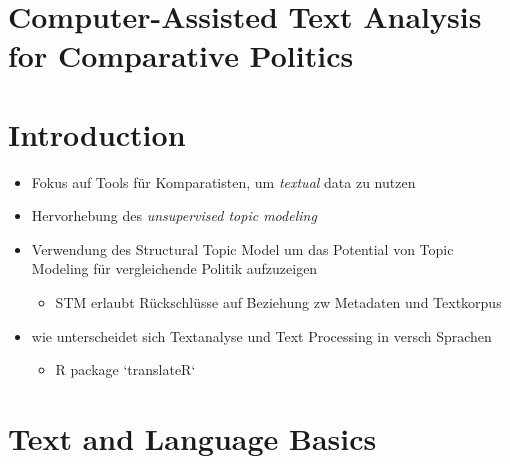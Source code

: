 \documentclass[11pt]{article}
\date{\today}
\title{}
\begin{document}
\tableofcontents

\section{Computer-Assisted Text Analysis for Comparative Politics}
\label{sec:org0e95a2d}
\section{Introduction}
\label{sec:org86c6b4e}
\begin{itemize}
\item Fokus auf Tools für Komparatisten, um \emph{textual} data zu nutzen
\item Hervorhebung des \emph{unsupervised topic modeling}
\item Verwendung des Structural Topic Model um das Potential von Topic Modeling für vergleichende Politik aufzuzeigen
\begin{itemize}
\item STM erlaubt Rückschlüsse auf Beziehung zw Metadaten und Textkorpus
\end{itemize}
\item wie unterscheidet sich Textanalyse und Text Processing in versch Sprachen
\begin{itemize}
\item R package `translateR`
\end{itemize}
\end{itemize}
\section{Text and Language Basics}
\label{sec:orgce02cc3}
\end{document}
